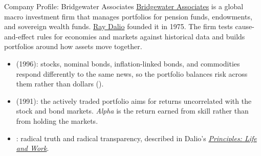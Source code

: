 \documentclass[aspectratio=169,11pt]{beamer}
\begin{document}
\begin{frame}{Company Profile: Bridgewater Associates}
\href{https://www.bridgewater.com/}{Bridgewater Associates} is a global macro
investment firm that manages portfolios for pension funds, endowments, and
sovereign wealth funds. \href{https://www.bridgewater.com/our-founder}{Ray Dalio}
founded it in 1975. The firm tests cause-and-effect rules for economies and
markets against historical data and builds portfolios around how assets move together.

\vspace{0.6em}
\begin{itemize}\setlength{\itemsep}{0.5em}
\item {} (1996): stocks, nominal bonds, inflation-linked
  bonds, and commodities respond differently to the same news, so the portfolio
  balances risk across them rather than dollars (\href{https://bridgewater.brightspotcdn.com/fa/e3/d09e72bd401a8414c5c0bdaf88bb/bridgewater-associates-engineering-targeted-returns-and-risks-aug-2011.pdf}{}).
\item {} (1991): the actively traded portfolio aims for
  returns uncorrelated with the stock and bond markets. \emph{Alpha} is the
  return earned from skill rather than from holding the markets.
\item {}: radical truth and radical transparency, described in
  Dalio's \href{https://www.principles.com/}{\emph{Principles: Life and Work}}.
\end{itemize}
\end{frame}
\end{document}
